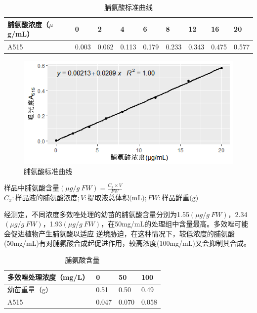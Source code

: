 \documentclass[UTF8]{ctexart}
\begin{document}
    \begin{table}[!h]
        \centering
        \setlength{\abovecaptionskip}{0.cm}
        \caption{脯氨酸标准曲线}
        \begin{tabular}{lllllllll}
        \hline
        脯氨酸浓度（$\mu$g/mL） & 0     & 2     & 4     & 6     & 8     & 12    & 16    & 20    \\ \hline
        A515         & 0.003 & 0.062 & 0.113 & 0.179 & 0.233 & 0.343 & 0.475 & 0.577 \\ \hline
        \end{tabular}
    \end{table}

    \begin{figure}
        \centering
        \caption{脯氨酸标准曲线}
        \setlength{\abovecaptionskip}{0pt}
        \includegraphics[scale=0.6]{pro.png}
    \end{figure}
    \begin{center}
        $\mbox{样品中脯氨酸含量}(\mu g/g \ FW)= \frac{C_{x} \times V}{FW} $
        \\ $C_{x}:\mbox{样品液的脯氨酸浓度}; V:\mbox{提取液总体积(mL)}; FW:\mbox{样品鲜重(g)}$
    \end{center}

    经测定，不同浓度多效唑处理的幼苗的脯氨酸含量分别为1.55$(\mu g/g \ FW)$，2.34$(\mu g/g \ FW)$，1.93$(\mu g/g \ FW)$，在50mg/mL的处理组中含量最高。多效唑可能会促进植物产生脯氨酸以适应
    逆境胁迫，在这种情况下，较低浓度的脯氨酸(50mg/mL)有对脯氨酸合成起促进作用，较高浓度(100mg/mL)又会抑制其合成。

    \begin{table}[!h]
        \centering
        \setlength{\abovecaptionskip}{0.cm}
        \caption{脯氨酸含量}
        \begin{tabular}{llll}
        \hline
        多效唑处理浓度（mg/L） & 0     & 50    & 100   \\ \hline
        幼苗重量（g）       & 0.51  & 0.50  & 0.49  \\
        A515          & 0.047 & 0.070 & 0.058 \\ \hline
        \end{tabular}
    \end{table}
\end{document}
